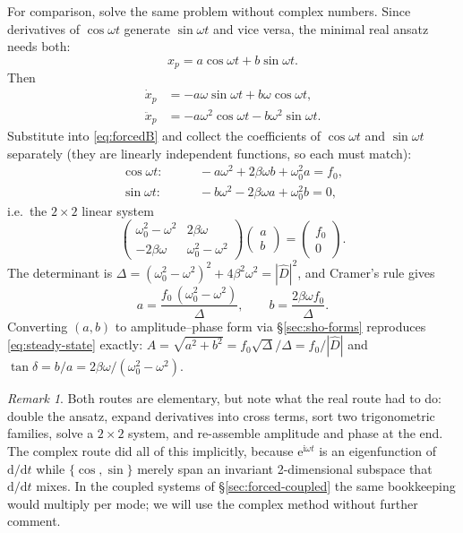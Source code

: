 \documentclass[11pt]{article}
\theoremstyle{plain}
\theoremstyle{definition}
\theoremstyle{remark}
\newtheorem{remark}[lemma]{Remark}
\newcommand{\dd}{\mathrm{d}}
\newcommand{\ee}{\mathrm{e}}
\newcommand{\ii}{\mathrm{i}}
\begin{document}
For comparison, solve the same problem without complex numbers. Since
derivatives of $\cos\omega t$ generate $\sin\omega t$ and vice versa, the
minimal real ansatz needs both:
\begin{equation}
  x_p = a\cos\omega t + b \sin\omega t .
\end{equation}
Then
\begin{align}
  \dot x_p &= -a\omega \sin\omega t + b\omega\cos\omega t, \\
  \ddot x_p &= -a\omega^2 \cos\omega t - b\omega^2 \sin\omega t .
\end{align}
Substitute into \eqref{eq:forcedB} and collect the coefficients of
$\cos\omega t$ and $\sin\omega t$ separately (they are linearly independent
functions, so each must match):
\begin{align}
  \cos\omega t:&\qquad -a\omega^2 + 2\beta\omega b + \omega_0^2 a = f_0, \nonumber\\
  \sin\omega t:&\qquad -b\omega^2 - 2\beta\omega a + \omega_0^2 b = 0,
\end{align}
i.e.\ the $2\times2$ linear system
\begin{equation}
  \begin{pmatrix}
    \omega_0^2-\omega^2 & 2\beta\omega \\
    -2\beta\omega & \omega_0^2 - \omega^2
  \end{pmatrix}
  \begin{pmatrix} a \\ b\end{pmatrix}
  =
  \begin{pmatrix} f_0 \\ 0 \end{pmatrix}.
\end{equation}
The determinant is
$\Delta = (\omega_0^2-\omega^2)^2 + 4\beta^2\omega^2 = |\hat D|^2$, and Cramer's
rule gives
\begin{equation}
  a = \frac{f_0\,(\omega_0^2-\omega^2)}{\Delta},
  \qquad
  b = \frac{2\beta\omega f_0}{\Delta}.
\end{equation}
Converting $(a,b)$ to amplitude--phase form via \S\ref{sec:sho-forms}
reproduces \eqref{eq:steady-state} exactly:
$A = \sqrt{a^2+b^2} = f_0\sqrt{\Delta}/\Delta = f_0/|\hat D|$ and
$\tan\delta = b/a = 2\beta\omega/(\omega_0^2-\omega^2)$.

\begin{remark}
Both routes are elementary, but note what the real route had to do: double
the ansatz, expand derivatives into cross terms, sort two trigonometric
families, solve a $2\times 2$ system, and re-assemble amplitude and phase at
the end. The complex route did all of this implicitly, because
$\ee^{\ii\omega t}$ is an eigenfunction of $\dd/\dd t$ while
$\{\cos,\sin\}$ merely span an invariant 2-dimensional subspace that
$\dd/\dd t$ mixes. In the coupled systems of \S\ref{sec:forced-coupled} the
same bookkeeping would multiply per mode; we will use the complex method
without further comment.
\end{remark}
\end{document}
